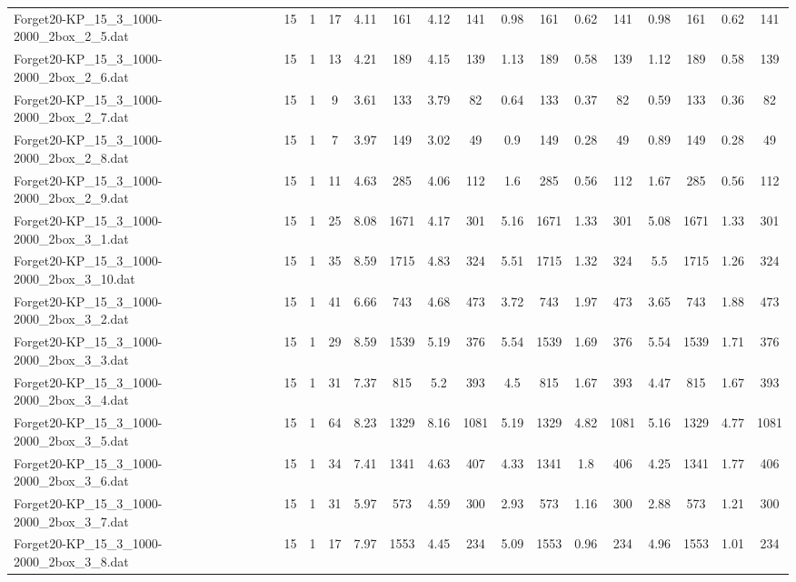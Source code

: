 \begin{sidewaystable}[!ht]
{\begin{tabular}{lccccccccccccccc}
Forget20-KP\_15\_3\_1000-2000\_2box\_2\_5.dat & 15 & 1 & 17 & 4.11 & 161 & 4.12 & 141 & 0.98 & 161 &  \textcolor{blue2}{0.62} & 141 & 0.98 & 161 &  \textcolor{blue2}{0.62} & 141 \\
Forget20-KP\_15\_3\_1000-2000\_2box\_2\_6.dat & 15 & 1 & 13 & 4.21 & 189 & 4.15 & 139 & 1.13 & 189 &  \textcolor{blue2}{0.58} & 139 & 1.12 & 189 &  \textcolor{blue2}{0.58} & 139 \\
Forget20-KP\_15\_3\_1000-2000\_2box\_2\_7.dat & 15 & 1 & 9 & 3.61 & 133 & 3.79 & 82 & 0.64 & 133 & 0.37 & 82 & 0.59 & 133 &  \textcolor{blue2}{0.36} & 82 \\
Forget20-KP\_15\_3\_1000-2000\_2box\_2\_8.dat & 15 & 1 & 7 & 3.97 & 149 & 3.02 & 49 & 0.9 & 149 &  \textcolor{blue2}{0.28} & 49 & 0.89 & 149 &  \textcolor{blue2}{0.28} & 49 \\
Forget20-KP\_15\_3\_1000-2000\_2box\_2\_9.dat & 15 & 1 & 11 & 4.63 & 285 & 4.06 & 112 & 1.6 & 285 & 0.56 & 112 & 1.67 & 285 & 0.56 & 112 \\
Forget20-KP\_15\_3\_1000-2000\_2box\_3\_1.dat & 15 & 1 & 25 & 8.08 & 1671 & 4.17 & 301 & 5.16 & 1671 & 1.33 & 301 & 5.08 & 1671 & 1.33 & 301 \\
Forget20-KP\_15\_3\_1000-2000\_2box\_3\_10.dat & 15 & 1 & 35 & 8.59 & 1715 & 4.83 & 324 & 5.51 & 1715 & 1.32 & 324 & 5.5 & 1715 & 1.26 & 324 \\
Forget20-KP\_15\_3\_1000-2000\_2box\_3\_2.dat & 15 & 1 & 41 & 6.66 & 743 & 4.68 & 473 & 3.72 & 743 & 1.97 & 473 & 3.65 & 743 &  \textcolor{blue2}{1.88} & 473 \\
Forget20-KP\_15\_3\_1000-2000\_2box\_3\_3.dat & 15 & 1 & 29 & 8.59 & 1539 & 5.19 & 376 & 5.54 & 1539 & 1.69 & 376 & 5.54 & 1539 & 1.71 & 376 \\
Forget20-KP\_15\_3\_1000-2000\_2box\_3\_4.dat & 15 & 1 & 31 & 7.37 & 815 & 5.2 & 393 & 4.5 & 815 & 1.67 & 393 & 4.47 & 815 & 1.67 & 393 \\
Forget20-KP\_15\_3\_1000-2000\_2box\_3\_5.dat & 15 & 1 & 64 & 8.23 & 1329 & 8.16 & 1081 & 5.19 & 1329 & 4.82 & 1081 & 5.16 & 1329 & 4.77 & 1081 \\
Forget20-KP\_15\_3\_1000-2000\_2box\_3\_6.dat & 15 & 1 & 34 & 7.41 & 1341 & 4.63 & 407 & 4.33 & 1341 & 1.8 & 406 & 4.25 & 1341 &  \textcolor{blue2}{1.77} & 406 \\
Forget20-KP\_15\_3\_1000-2000\_2box\_3\_7.dat & 15 & 1 & 31 & 5.97 & 573 & 4.59 & 300 & 2.93 & 573 & 1.16 & 300 & 2.88 & 573 & 1.21 & 300 \\
Forget20-KP\_15\_3\_1000-2000\_2box\_3\_8.dat & 15 & 1 & 17 & 7.97 & 1553 & 4.45 & 234 & 5.09 & 1553 &  \textcolor{blue2}{0.96} & 234 & 4.96 & 1553 & 1.01 & 234 \\

\end{tabular}}
\end{sidewaystable}
